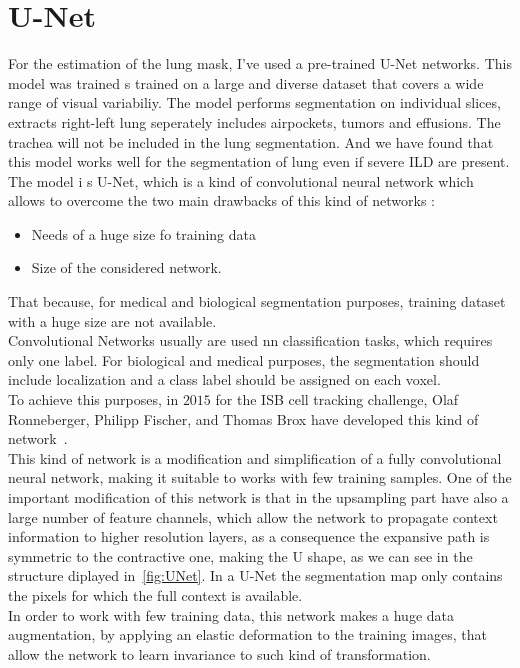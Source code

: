 \documentclass{standalone}
\begin{document}
		\chapter*{U-Net}
		
		For the estimation of the lung mask, I've used a pre-trained U-Net networks. This model was trained s trained on a large and diverse dataset that covers a wide range of visual variabiliy. The model performs segmentation on individual slices, extracts right-left lung seperately includes airpockets, tumors and effusions. The trachea will not be included in the lung segmentation. And we have found that this model works well for the segmentation of lung even if severe ILD are present.\\
		The model i s U-Net, which is a kind of convolutional neural network which allows to overcome the two main drawbacks of this kind of networks :
		\begin{itemize}
			\item Needs of a huge size fo training data
			\item Size of the considered network. 
		\end{itemize}
	
	That because, for medical and biological segmentation purposes, training dataset with a huge size are not available.\\
	Convolutional Networks usually are used nn classification tasks, which requires only one label. For biological and medical purposes, the segmentation should include localization and a class label should be assigned on each voxel.\\
	To achieve this purposes, in $2015$ for the ISB cell tracking challenge, Olaf Ronneberger, Philipp Fischer, and Thomas Brox have developed this kind of network~\cite{ART:Johannes}. \\
	This kind of network is a modification and simplification of a fully convolutional neural network, making it suitable to works with few training samples.
	One of the important modification of this network is that in the upsampling part  have also a large number of feature channels, which allow the network
	to propagate context information to higher resolution layers, as a consequence the expansive path is symmetric to the contractive one, making the U shape, as we can see in the structure diplayed in \figurename\,\ref{fig:UNet}. In a U-Net the segmentation map only contains the pixels for which the full context is available.\\
	In order to work with few training data, this network makes a huge data augmentation, by applying an elastic deformation to the training images, that allow the network to learn invariance to such kind of transformation. 
	
\end{document}
